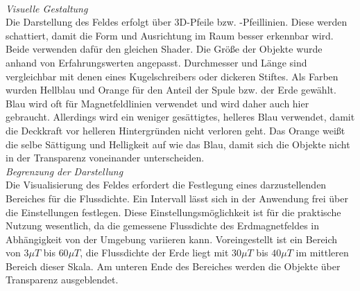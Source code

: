 \vspace{4px}
\begin{center}
	\\
\end{center}
\vspace{6px}

\textit{Visuelle Gestaltung}\\
Die Darstellung des Feldes erfolgt über 3D-Pfeile bzw. -Pfeillinien. Diese werden schattiert, damit die Form und Ausrichtung im Raum besser erkennbar wird. Beide verwenden dafür den gleichen Shader. Die Größe der Objekte wurde anhand von Erfahrungswerten angepasst. Durchmesser und Länge sind vergleichbar mit denen eines Kugelschreibers oder dickeren Stiftes. Als Farben wurden Hellblau und Orange für den Anteil der Spule bzw. der Erde gewählt. Blau wird oft für Magnetfeldlinien verwendet und wird daher auch hier gebraucht. Allerdings wird ein weniger gesättigtes, helleres Blau verwendet, damit die Deckkraft vor helleren Hintergründen nicht verloren geht. Das Orange weißt die selbe Sättigung und Helligkeit auf wie das Blau, damit sich die Objekte nicht in der Transparenz voneinander unterscheiden.\\

\textit{Begrenzung der Darstellung}\\
Die Visualisierung des Feldes erfordert die Festlegung eines darzustellenden Bereiches für die Flussdichte. Ein Intervall lässt sich in der Anwendung frei über die Einstellungen festlegen. Diese Einstellungsmöglichkeit ist für die praktische Nutzung wesentlich, da die gemessene Flussdichte des Erdmagnetfeldes in Abhängigkeit von der Umgebung variieren kann. Voreingestellt ist ein Bereich von $3\mu T$ bis $60\mu T$, die Flussdichte der Erde liegt mit $30 \mu T$ bis $40 \mu T$ im mittleren Bereich dieser Skala. Am unteren Ende des Bereiches werden die Objekte über Transparenz ausgeblendet.\\

